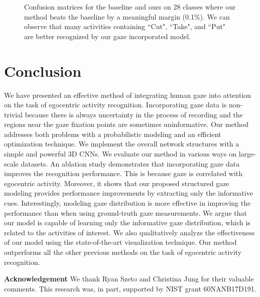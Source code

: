 \documentclass[10pt,twocolumn,letterpaper]{article}
\begin{document}
\begin{figure*}[htbp]
\centering
\hspace{-6pt}
  \hspace{0.6cm}
  \caption{Confusion matrices for the baseline and ours on 28 classes where our method beats the baseline by a meaningful margin (0.1\%). We can observe that many activities containing ``Cut", ``Take", and ``Put" are better recognized by our gaze incorporated model.}
  \label{fig:conf2}
\end{figure*}

\section{Conclusion} \label{sec:con}
We have presented an effective method of integrating human gaze into attention on the task of egocentric activity recognition. Incorporating gaze data is non-trivial because there is always uncertainty in the process of recording and the regions near the gaze fixation points are sometimes uninformative. Our method addresses both problems with a probabilistic modeling and an efficient optimization technique. We implement the overall network structures with a simple and powerful 3D CNNs. We evaluate our method in various ways on large-scale datasets. An ablation study demonstrates that incorporating gaze data improves the recognition performance. This is because gaze is correlated with egocentric activity. Moreover, it shows that our proposed structured gaze modeling provides performance improvements by extracting only the informative cues. Interestingly, modeling gaze distribution is more effective in improving the performance than when using ground-truth gaze measurements. We argue that our model is capable of learning only the informative gaze distribution, which is related to the activities of interest. We also qualitatively analyze the effectiveness of our model using the state-of-the-art visualization technique. Our method outperforms all the other previous methods on the task of egocentric activity recognition.



\noindent \textbf{Acknowledgement }
We thank Ryan Szeto and Christina Jung for their valuable comments. This research was, in part, supported by NIST grant 60NANB17D191.






{\small


}
\end{document}
